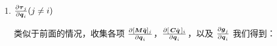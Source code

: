 \documentclass[letterpaper, 10 pt, conference]{ieeetran}  %
\begin{document}
{\begin{enumerate}
在这里重新排列各项


\begin{equation}
    \begin{aligned}
        \frac{\partial \taubar_{i}}{\partial \q_{j}} = \Phibar_{i}^{T} [  \I_{i}^{C}  (\xibar_{\lambda(j)}+\gammabar_{\lambda(j)}+\a_{0} ) \times \Phibar_{j}   +\\
        2 \B_{i}^{C} \Psibardot_{j}  +  \I_{i}^{C} \v_{\lambda(j)} \times \Psibardot_{j}]
        \end{aligned}
\end{equation}

化简：

\begin{equation}
    \begin{aligned}
        \frac{\partial \taubar_{i}}{\partial \q_{j}} = \Phibar_{i}^{T} [  \I_{i}^{C}  \a_{\lambda(j)} \times \Phibar_{j}   +   2 \B_{i}^{C} \Psibardot_{j}  +  \\
        \I_{i}^{C} \v_{\lambda(j)} \times \Psibardot_{j}]     
    \end{aligned}
\end{equation}


\begin{equation}
    \begin{aligned}
    \frac{\partial \taubar_{i}}{\partial \q_{j}} = \Phibar_{i}^{T} [  \I_{i}^{C}  \a_{\lambda(j)}   \times \Phibar_{j}  +  2 \B_{i}^{C} \Psibardot_{j}  + \\ \I_{i}^{C} \v_{\lambda(j)} \times \Psibardot_{j}]     
    \end{aligned}
\end{equation}

使用 $\Psibarddot_{k}$ (方程~\ref{psidot_psidotdot_defn})，对于 $\frac{\partial \taubar_{i}}{\partial \q_{j}} $ 的最终紧凑表达式为：

\begin{equation}
    \frac{\partial \taubar_{i}}{\partial \q_{j}} =  \Phibar_{i}^{T} \big[ 2  \B_{i}^{C} \big] \Psibardot{}_{j} + \Phibar_{i}^{T}  \I_{i}^{C} \Psibarddot{}_{j}
    \label{dtau_dq_eqn1}
\end{equation}

\item $\frac{\partial \boldsymbol{\tau}_{j}}{\partial \boldsymbol{q}_{i}}  (j \neq i)$

\vspace{1ex}
类似于前面的情况，收集各项 $\frac{\partial [ \boldsymbol{M} \ddot{\boldsymbol{q}}]_{j}}{\partial \boldsymbol{q}_{i}}$，$  \frac{\partial  [\,\boldsymbol{C} \dot{\boldsymbol{q}}\,]_{i}}{\partial \boldsymbol{q}_{i}}$，以及 $ \frac{\partial \boldsymbol{g}_{j}}{ \partial \boldsymbol{q}_{i}}$ 我们得到：


\end{enumerate}}
\end{document}
